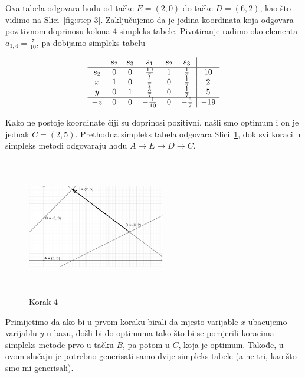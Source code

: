 \documentclass[a4paper, utf8, 11pt, colorlinks]{book}
\begin{document}
Ova tabela odgovara hodu od tačke $E=(2,0)$ do tačke $D=(6,2)$, kao što vidimo na Slici~\ref{fig:step-3}.
Zaključujemo da je jedina koordinata koja odgovara pozitivnom doprinosu kolona 
4 simpleks tabele. Pivotiranje radimo oko elementa $\overline{a}_{1,4} = \frac{7}{10}$, pa dobijamo simpleks tabelu 

$$\begin{array}{cccccc| c}
	& s_2  & s_3   & s_1  & s_2 & s_3 &     \\ \hline
s_2 &  0   &  0    & \frac{10}{7}    &  1   & \frac{1}{7}   & 10 \\
x   &  1   &  0    &  \frac{4}{7}    &  0   & \frac{1}{7}  & 2 \\
y   &  0   &  1    &  \frac{3}{7}    &  0   & \frac{1}{7}   & 5  \\ \hline
-z  &  0   &  0   &   -\frac{1}{10}  & 0    &  -\frac{5}{7} & -19 \\
\end{array}
$$ 

Kako ne postoje koordinate čiji su doprinosi pozitivni, našli smo optimum i on je jednak 
$C=(2,5)$. Prethodna simpleks tabela odgovara Slici~\ref{fig:step-4}, dok svi koraci u simpleks metodi odgovaraju 
hodu $A \rightarrow E \rightarrow D \rightarrow C$. 

\begin{figure}[H]
	\centering
	\includegraphics[width=170pt, height=170pt]{simpleks-primjer-2-sl4.eps}
	\caption{Korak 4}
	\label{fig:step-4}
\end{figure}


Primijetimo da ako bi u prvom koraku birali da mjesto varijable $x$ ubacujemo varijablu $y$ u bazu, došli bi do optimuma tako što bi se pomjerili koracima simpleks metode prvo u tačku $B$, pa potom u $C$, koja je optimum. Takođe, u ovom slučaju je potrebno generisati samo dvije simpleks tabele (a ne tri, kao što smo mi generisali).
\end{document}
